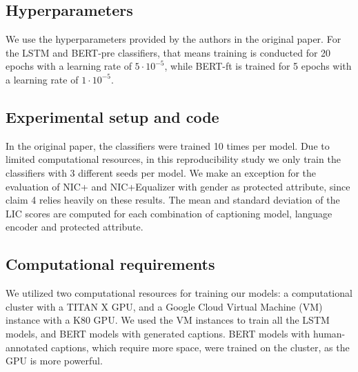 \subsection{Hyperparameters} 
We use the hyperparameters provided by the authors in the original paper. For the LSTM and BERT-pre classifiers, that means training is conducted for 20 epochs with a learning rate of $5 \cdot 10^{-5}$, while BERT-ft is trained for 5 epochs with a learning rate of $1 \cdot 10^{-5}$.


\subsection{Experimental setup and code}
In the original paper, the classifiers were trained 10 times per model. Due to limited computational resources, in this reproducibility study we only train the classifiers with 3 different seeds per model. We make an exception for the evaluation of NIC+ and NIC+Equalizer with gender as protected attribute, since claim 4 relies heavily on these results. The mean and standard deviation of the LIC scores are computed for each combination of captioning model, language encoder and protected attribute.  %


\subsection{Computational requirements}
We utilized two computational resources for training our models: a computational cluster with a TITAN X GPU, and a Google Cloud Virtual Machine (VM) instance with a K80 GPU. We used the VM instances to train all the LSTM models, and BERT models with generated captions. BERT models with human-annotated captions, which require more space, were trained on the cluster, as the GPU is more powerful.


